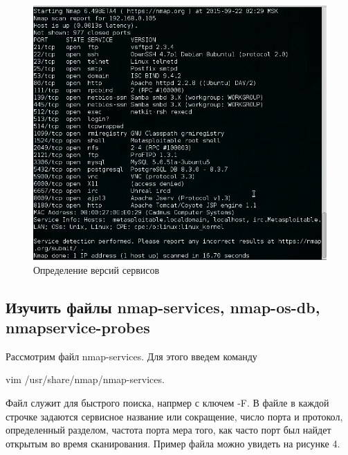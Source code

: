 \documentclass[11pt, a4paper]{article}		%
\begin{document}
\begin{figure}[h!]
\centering
\includegraphics[scale=0.8]{res/3}
\caption{Определение версий сервисов}
\end{figure}


\subsection{Изучить файлы nmap-services, nmap-os-db, nmapservice-probes}

Рассмотрим файл nmap-services. Для этого введем команду 

vim /usr/share/nmap/nmap-services. 

Файл служит для быстрого поиска, напрмер с ключем -F. В файле в каждой строчке задаются сервисное название или сокращение, число порта и протокол, определенный разделом, частота порта мера того, как часто порт был найдет открытым во время сканирования. Пример файла можно увидеть на рисунке 4.
\end{document}
